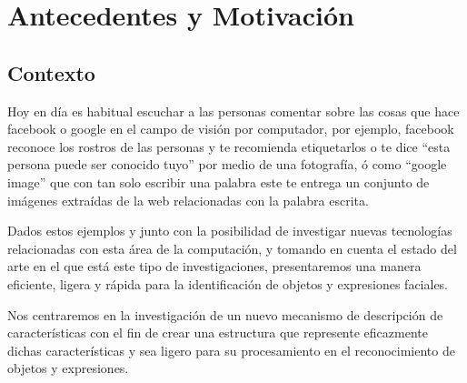 \documentclass[a4paper,12pt]{article}
\begin{document}
\section{Antecedentes y Motivación}

\subsection{Contexto}
Hoy en día es habitual escuchar a las personas comentar sobre las cosas que hace facebook o google en el campo de visión por computador, por ejemplo, facebook reconoce los rostros de las personas y te recomienda etiquetarlos o te dice ``esta persona puede ser conocido tuyo'' por medio de una fotografía, ó como ``google image'' que con tan solo escribir una palabra este te entrega un conjunto de imágenes extraídas de la web relacionadas con la palabra escrita.

Dados estos ejemplos y junto con la posibilidad de investigar nuevas tecnologías relacionadas con esta área de la computación, y tomando en cuenta el estado del arte en el que está este tipo de investigaciones, presentaremos una manera eficiente, ligera y rápida para la identificación de objetos y expresiones faciales.

Nos centraremos en la investigación de un nuevo mecanismo de descripción de características con el fin de crear una estructura que represente eficazmente dichas características y sea ligero para su procesamiento en el reconocimiento de objetos y expresiones.
\end{document}
